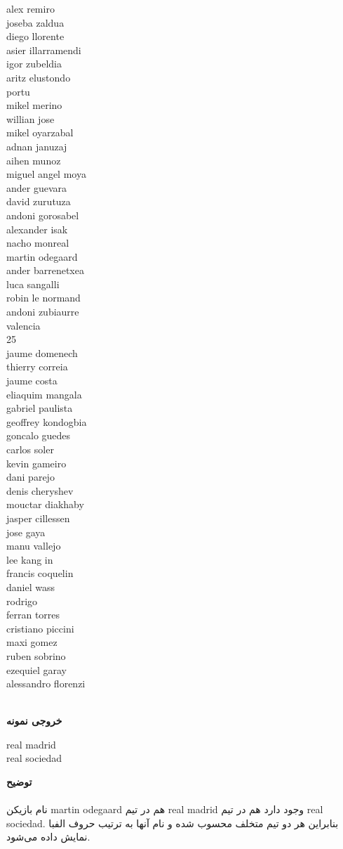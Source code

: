 \documentclass[]{article}
\newcommand{\outputsample}[1]{
    ~\\
    \textbf{خروجی نمونه}

    \begin{tcolorbox}[breakable,boxrule=0pt]
        \begin{latin}
            \large{
                #1
            }
        \end{latin}
    \end{tcolorbox}
}
\begin{document}
{alex remiro\\
joseba zaldua\\
diego llorente\\
asier illarramendi\\
igor zubeldia\\
aritz elustondo\\
portu\\
mikel merino\\
willian jose\\
mikel oyarzabal\\
adnan januzaj\\
aihen munoz\\
miguel angel moya\\
ander guevara\\
david zurutuza\\
andoni gorosabel\\
alexander isak\\
nacho monreal\\
martin odegaard\\
ander barrenetxea\\
luca sangalli\\
robin le normand\\
andoni zubiaurre\\
valencia\\
25\\
jaume domenech\\
thierry correia\\
jaume costa\\
eliaquim mangala\\
gabriel paulista\\
geoffrey kondogbia\\
goncalo guedes\\
carlos soler\\
kevin gameiro\\
dani parejo\\
denis cheryshev\\
mouctar diakhaby\\
jasper cillessen\\
jose gaya\\
manu vallejo\\
lee kang in\\
francis coquelin\\
daniel wass\\
rodrigo\\
ferran torres\\
cristiano piccini\\
maxi gomez\\
ruben sobrino\\
ezequiel garay\\
alessandro florenzi
}
\outputsample{
real madrid\\
real sociedad
}
\textbf{توضیح}\\\\
نام بازیکن martin odegaard هم در تیم real madrid وجود دارد هم در تیم real sociedad. بنابراین هر دو تیم متخلف محسوب شده و نام آنها به ترتیب حروف الفبا نمایش داده می‌شود.
\end{document}
